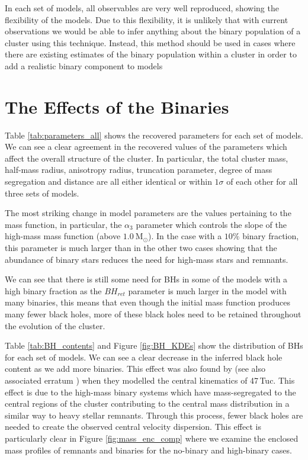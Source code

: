 In each set of models, all observables are very well reproduced, showing the flexibility of the
 models. Due to this flexibility, it is unlikely that with current observations we
would be able to infer anything about the binary population of a cluster using this technique.
Instead, this method should be used in cases where there are existing estimates of the binary
population within a cluster in order to add a realistic binary component to  models



\section{The Effects of the Binaries}


Table \ref{tab:parameters_all} shows the recovered parameters for each set of models. We can see a
clear agreement in the recovered values of the parameters which affect the overall structure of the
cluster. In particular, the total cluster mass, half-mass radius, anisotropy radius, truncation
parameter, degree of mass segregation and distance are all either identical or within $1\sigma$ of
each other for all three sets of models.



The most striking change in model parameters are the values pertaining to the mass function, in
particular, the $\alpha_3$ parameter which controls the slope of the high-mass mass function (above
$1.0 \ \mathrm{M}_\odot$). In the case with a $10\%$ binary fraction, this parameter is much larger
than in the other two cases showing that the abundance of binary stars reduces the need for high-mass
stars and remnants.

We can see that there is still some need for BHs in some of the models with a high binary fraction
as the $BH_{ret}$ parameter is much larger in the model with many binaries, this means that even
though the initial mass function produces many fewer black holes, more of these black holes need to
be retained throughout the evolution of the cluster.

Table \ref{tab:BH_contents} and Figure \ref{fig:BH_KDEs} show the distribution of BHs for each set
of models. We can see a clear decrease in the inferred black hole content as we add more binaries.
This effect was also found by \citet{Mann2019} (see also associated erratum \citealt{Mann2020}) when
they modelled the central kinematics of 47\,Tuc. This effect is due to the high-mass binary systems
which have mass-segregated to the central regions of the cluster contributing to the central mass
distribution in a similar way to heavy stellar remnants. Through this process, fewer black holes are
needed to create the observed central velocity dispersion. This effect is particularly clear in
Figure \ref{fig:mass_enc_comp} where we examine the enclosed mass profiles of remnants and binaries
for the no-binary and high-binary cases.



